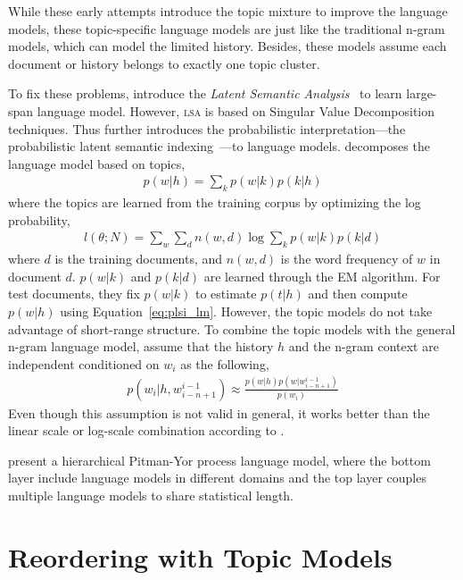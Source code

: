 While these early attempts introduce the topic mixture to improve the language models, these topic-specific language models are just like the traditional n-gram models, which can model the limited history. Besides, these models assume each document or history belongs to exactly one topic cluster. 

To fix these problems, \citet{Bellegarda-1997,Coccaro-1998} introduce the \emph{Latent Semantic Analysis}~\citep[\textsc{lsa}]{deerwester-90} to learn large-span language model. However, \textsc{lsa} is based on Singular Value Decomposition techniques. Thus \citet{Gildea-1999} further introduces the probabilistic interpretation---the probabilistic latent semantic indexing~\citep[\textsc{plsi}]{hoffman-99}---to language models. \citet{Gildea-1999} decomposes the language model based on topics,
\begin{align}
\label{eq:plsi_lm}
p(w|h) = \sum_k p(w|k) p(k|h)
\end{align}
where the topics are learned from the training corpus by optimizing the log probability,
\begin{align}
l(\theta; N) = \sum_w \sum_d n(w,d) \log \sum_k p(w|k) p(k|d)
\end{align}
where $d$ is the training documents, and $n(w,d)$ is the word frequency of $w$ in document $d$. $p(w|k)$ and $p(k|d)$ are learned through the EM algorithm. For test documents, they fix $p(w|k)$ to estimate $p(t|h)$ and then compute $p(w|h)$ using Equation~\ref{eq:plsi_lm}. However, the topic models do not take advantage of short-range structure. To combine the topic models with the general n-gram language model, \citet{Gildea-1999} assume that the history $h$ and the n-gram context are independent conditioned on $w_i$ as the following,
\begin{align}
p(w_i|h,w_{i-n+1}^{i-1}) \approx \frac{p(w|h)p(w|w_{i-n+1}^{i-1})}{p(w_i)}
\end{align}
Even though this assumption is not valid in general, it works better than the linear scale or log-scale combination according to \citet{Gildea-1999}.

\citet{Yu-2013}

\citet{wood-09} present a hierarchical Pitman-Yor process language model, where the bottom layer include language models in different domains and the top layer couples multiple language models to share statistical length.

\section{Reordering with Topic Models}

